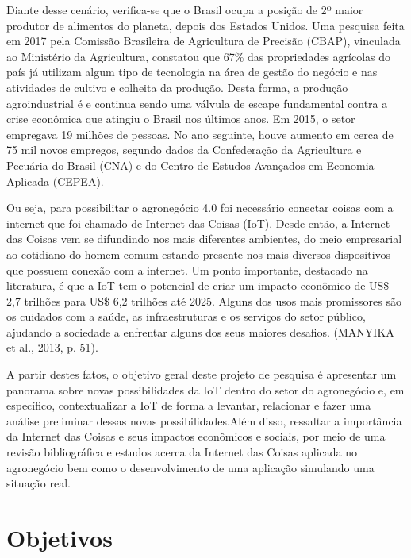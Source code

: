 \documentclass[eso]{bcc}
\begin{document}
Diante desse cenário, verifica-se que o Brasil ocupa a posição de 2º maior produtor de alimentos 
do planeta, depois dos Estados Unidos. Uma pesquisa feita em 2017 pela Comissão Brasileira de 
Agricultura de Precisão (CBAP), vinculada ao Ministério da Agricultura, constatou que 67\% das 
propriedades agrícolas do país já utilizam algum tipo de tecnologia na área de gestão do negócio 
e nas atividades de cultivo e colheita da produção. Desta forma, a produção agroindustrial é 
e continua sendo uma válvula de escape fundamental contra a crise econômica que atingiu o Brasil 
nos últimos anos. Em 2015, o setor empregava 19 milhões de pessoas. No ano seguinte, houve aumento 
em cerca de 75 mil novos empregos, segundo dados da Confederação da Agricultura e Pecuária do Brasil 
(CNA) e do Centro de Estudos Avançados em Economia Aplicada (CEPEA).

Ou seja, para possibilitar o agronegócio 4.0 foi necessário conectar coisas com a internet que 
foi chamado de Internet das Coisas (IoT). Desde então, a Internet das Coisas vem se difundindo 
nos mais diferentes ambientes, do meio empresarial ao cotidiano do homem comum estando presente 
nos mais diversos dispositivos que possuem conexão com a internet. Um ponto importante, 
destacado na literatura, é que a IoT tem o potencial de criar um impacto econômico de 
US\$ 2,7 trilhões para US\$ 6,2 trilhões até 2025. Alguns dos usos mais promissores são os 
cuidados com a saúde, as infraestruturas e os serviços do setor público, ajudando a sociedade 
a enfrentar alguns dos seus maiores desafios. (MANYIKA et al., 2013, p. 51).

A partir destes fatos, o objetivo geral deste projeto de pesquisa é apresentar um panorama 
sobre novas possibilidades da IoT dentro do setor do agronegócio e, em específico, 
contextualizar a IoT de forma a levantar, relacionar e fazer uma análise preliminar dessas 
novas possibilidades.Além disso, ressaltar  a  importância  da Internet das Coisas e seus 
impactos econômicos e sociais,  por meio de uma revisão bibliográfica e estudos acerca da 
Internet das Coisas aplicada no agronegócio bem como o desenvolvimento de uma aplicação 
simulando uma situação real.


\section{Objetivos}
\end{document}
